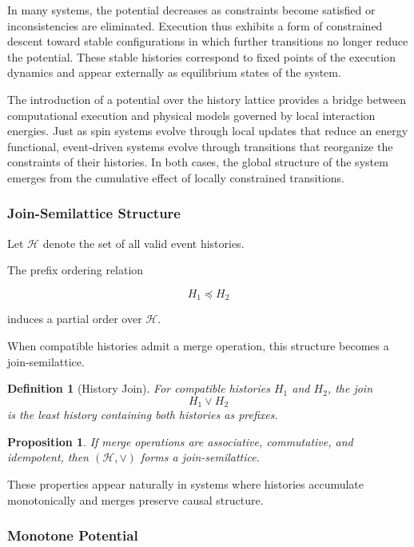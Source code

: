 \documentclass[12pt]{article}
\newtheorem{definition}{Definition}
\newtheorem{proposition}{Proposition}
\begin{document}
In many systems, the potential decreases as constraints
become satisfied or inconsistencies are eliminated.
Execution thus exhibits a form of constrained descent
toward stable configurations in which further transitions
no longer reduce the potential. These stable histories
correspond to fixed points of the execution dynamics and
appear externally as equilibrium states of the system.

The introduction of a potential over the history lattice
provides a bridge between computational execution and
physical models governed by local interaction energies.
Just as spin systems evolve through local updates that
reduce an energy functional, event-driven systems evolve
through transitions that reorganize the constraints of
their histories. In both cases, the global structure of
the system emerges from the cumulative effect of locally
constrained transitions.

\subsubsection{Join-Semilattice Structure}

Let $\mathcal{H}$ denote the set of all valid event histories.

The prefix ordering relation

\[
H_1 \preceq H_2
\]

induces a partial order over $\mathcal{H}$.

When compatible histories admit a merge operation,
this structure becomes a join-semilattice.

\begin{definition}[History Join]
For compatible histories $H_1$ and $H_2$, the join
\[
H_1 \vee H_2
\]
is the least history containing both histories as prefixes.
\end{definition}

\begin{proposition}
If merge operations are associative, commutative,
and idempotent, then $(\mathcal{H}, \vee)$ forms
a join-semilattice.
\end{proposition}

These properties appear naturally in systems where
histories accumulate monotonically and merges
preserve causal structure.

\subsubsection{Monotone Potential}
\end{document}
